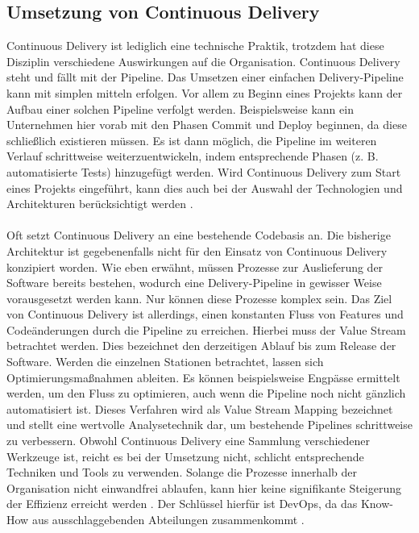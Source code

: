 \subsection{Umsetzung von Continuous Delivery}
Continuous Delivery ist lediglich eine technische Praktik, trotzdem hat diese Disziplin verschiedene Auswirkungen auf die Organisation. Continuous Delivery steht und fällt mit der Pipeline. Das Umsetzen einer einfachen Delivery-Pipeline kann mit simplen mitteln erfolgen. Vor allem zu Beginn eines Projekts kann der Aufbau einer solchen Pipeline verfolgt werden. Beispielsweise kann ein Unternehmen hier vorab mit den Phasen Commit und Deploy beginnen, da diese schließlich existieren müssen. Es ist dann möglich, die Pipeline im weiteren Verlauf schrittweise weiterzuentwickeln, indem entsprechende Phasen (z. B. automatisierte Tests) hinzugefügt werden. Wird Continuous Delivery zum Start eines Projekts eingeführt, kann dies auch bei der Auswahl der Technologien und Architekturen berücksichtigt werden \cite{Wolff.2016}. \\ \\
Oft setzt Continuous Delivery an eine bestehende Codebasis an. Die bisherige Architektur ist gegebenenfalls nicht für den Einsatz von Continuous Delivery konzipiert worden. Wie eben erwähnt, müssen Prozesse zur Auslieferung der Software bereits bestehen, wodurch eine Delivery-Pipeline in gewisser Weise vorausgesetzt werden kann. Nur können diese Prozesse komplex sein. Das Ziel von Continuous Delivery ist allerdings, einen konstanten Fluss von Features und Codeänderungen durch die Pipeline zu erreichen. Hierbei muss der Value Stream betrachtet werden. Dies bezeichnet den derzeitigen Ablauf bis zum Release der Software. Werden die einzelnen Stationen betrachtet, lassen sich Optimierungsmaßnahmen ableiten. Es können beispielsweise Engpässe ermittelt werden, um den Fluss zu optimieren, auch wenn die Pipeline noch nicht gänzlich automatisiert ist. Dieses Verfahren wird als Value Stream Mapping bezeichnet und stellt eine wertvolle Analysetechnik dar, um bestehende Pipelines schrittweise zu verbessern. Obwohl Continuous Delivery eine Sammlung verschiedener Werkzeuge ist, reicht es bei der Umsetzung nicht, schlicht entsprechende Techniken und Tools zu verwenden. Solange die Prozesse innerhalb der Organisation nicht einwandfrei ablaufen, kann hier keine signifikante Steigerung der Effizienz erreicht werden \cite{Virmani.2015}. Der Schlüssel hierfür ist DevOps, da das Know-How aus ausschlaggebenden Abteilungen zusammenkommt \cite{Wolff.2016}.

